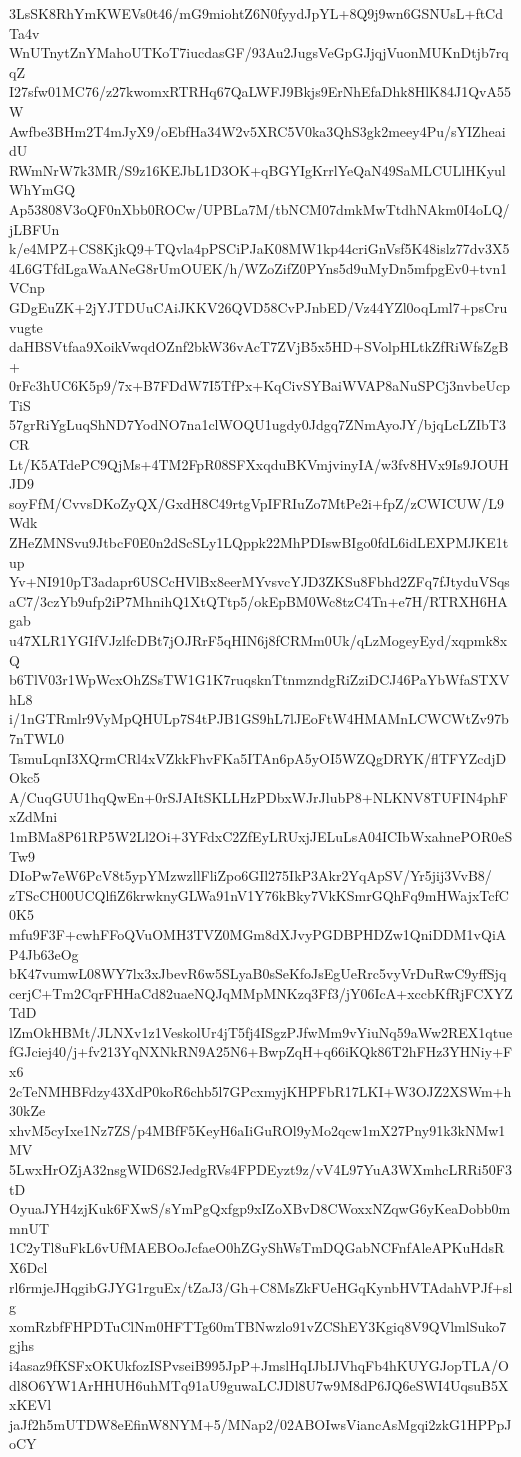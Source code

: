 3LsSK8RhYmKWEVs0t46/mG9miohtZ6N0fyydJpYL+8Q9j9wn6GSNUsL+ftCdTa4v
WnUTnytZnYMahoUTKoT7iucdasGF/93Au2JugsVeGpGJjqjVuonMUKnDtjb7rqqZ
I27sfw01MC76/z27kwomxRTRHq67QaLWFJ9Bkjs9ErNhEfaDhk8HlK84J1QvA55W
Awfbe3BHm2T4mJyX9/oEbfHa34W2v5XRC5V0ka3QhS3gk2meey4Pu/sYIZheaidU
RWmNrW7k3MR/S9z16KEJbL1D3OK+qBGYIgKrrlYeQaN49SaMLCULlHKyulWhYmGQ
Ap53808V3oQF0nXbb0ROCw/UPBLa7M/tbNCM07dmkMwTtdhNAkm0I4oLQ/jLBFUn
k/e4MPZ+CS8KjkQ9+TQvla4pPSCiPJaK08MW1kp44criGnVsf5K48islz77dv3X5
4L6GTfdLgaWaANeG8rUmOUEK/h/WZoZifZ0PYns5d9uMyDn5mfpgEv0+tvn1VCnp
GDgEuZK+2jYJTDUuCAiJKKV26QVD58CvPJnbED/Vz44YZl0oqLml7+psCruvugte
daHBSVtfaa9XoikVwqdOZnf2bkW36vAcT7ZVjB5x5HD+SVolpHLtkZfRiWfsZgB+
0rFc3hUC6K5p9/7x+B7FDdW7I5TfPx+KqCivSYBaiWVAP8aNuSPCj3nvbeUcpTiS
57grRiYgLuqShND7YodNO7na1clWOQU1ugdy0Jdgq7ZNmAyoJY/bjqLcLZIbT3CR
Lt/K5ATdePC9QjMs+4TM2FpR08SFXxqduBKVmjvinyIA/w3fv8HVx9Is9JOUHJD9
soyFfM/CvvsDKoZyQX/GxdH8C49rtgVpIFRIuZo7MtPe2i+fpZ/zCWICUW/L9Wdk
ZHeZMNSvu9JtbcF0E0n2dScSLy1LQppk22MhPDIswBIgo0fdL6idLEXPMJKE1tup
Yv+NI910pT3adapr6USCcHVlBx8eerMYvsvcYJD3ZKSu8Fbhd2ZFq7fJtyduVSqs
aC7/3czYb9ufp2iP7MhnihQ1XtQTtp5/okEpBM0Wc8tzC4Tn+e7H/RTRXH6HAgab
u47XLR1YGIfVJzlfcDBt7jOJRrF5qHIN6j8fCRMm0Uk/qLzMogeyEyd/xqpmk8xQ
b6TlV03r1WpWcxOhZSsTW1G1K7ruqsknTtnmzndgRiZziDCJ46PaYbWfaSTXVhL8
i/1nGTRmlr9VyMpQHULp7S4tPJB1GS9hL7lJEoFtW4HMAMnLCWCWtZv97b7nTWL0
TsmuLqnI3XQrmCRl4xVZkkFhvFKa5ITAn6pA5yOI5WZQgDRYK/flTFYZcdjDOkc5
A/CuqGUU1hqQwEn+0rSJAItSKLLHzPDbxWJrJlubP8+NLKNV8TUFIN4phFxZdMni
1mBMa8P61RP5W2Ll2Oi+3YFdxC2ZfEyLRUxjJELuLsA04ICIbWxahnePOR0eSTw9
DIoPw7eW6PcV8t5ypYMzwzllFliZpo6GIl275IkP3Akr2YqApSV/Yr5jij3VvB8/
zTScCH00UCQlfiZ6krwknyGLWa91nV1Y76kBky7VkKSmrGQhFq9mHWajxTcfC0K5
mfu9F3F+cwhFFoQVuOMH3TVZ0MGm8dXJvyPGDBPHDZw1QniDDM1vQiAP4Jb63eOg
bK47vumwL08WY7lx3xJbevR6w5SLyaB0sSeKfoJsEgUeRrc5vyVrDuRwC9yffSjq
cerjC+Tm2CqrFHHaCd82uaeNQJqMMpMNKzq3Ff3/jY06IcA+xccbKfRjFCXYZTdD
lZmOkHBMt/JLNXv1z1VeskolUr4jT5fj4ISgzPJfwMm9vYiuNq59aWw2REX1qtue
fGJciej40/j+fv213YqNXNkRN9A25N6+BwpZqH+q66iKQk86T2hFHz3YHNiy+Fx6
2cTeNMHBFdzy43XdP0koR6chb5l7GPcxmyjKHPFbR17LKI+W3OJZ2XSWm+h30kZe
xhvM5cyIxe1Nz7ZS/p4MBfF5KeyH6aIiGuROl9yMo2qcw1mX27Pny91k3kNMw1MV
5LwxHrOZjA32nsgWID6S2JedgRVs4FPDEyzt9z/vV4L97YuA3WXmhcLRRi50F3tD
OyuaJYH4zjKuk6FXwS/sYmPgQxfgp9xIZoXBvD8CWoxxNZqwG6yKeaDobb0mmnUT
1C2yTl8uFkL6vUfMAEBOoJcfaeO0hZGyShWsTmDQGabNCFnfAleAPKuHdsRX6Dcl
rl6rmjeJHqgibGJYG1rguEx/tZaJ3/Gh+C8MsZkFUeHGqKynbHVTAdahVPJf+slg
xomRzbfFHPDTuClNm0HFTTg60mTBNwzlo91vZCShEY3Kgiq8V9QVlmlSuko7gjhs
i4asaz9fKSFxOKUkfozISPvseiB995JpP+JmslHqIJbIJVhqFb4hKUYGJopTLA/O
dl8O6YW1ArHHUH6uhMTq91aU9guwaLCJDl8U7w9M8dP6JQ6eSWI4UqsuB5XxKEVl
jaJf2h5mUTDW8eEfinW8NYM+5/MNap2/02ABOIwsViancAsMgqi2zkG1HPPpJoCY
